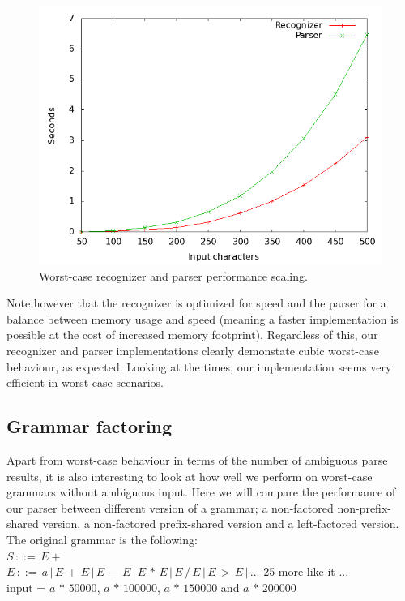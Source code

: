 \documentclass[a4paper,10pt]{article}
\begin{document}
\begin{figure}[H]
\centering
\includegraphics[scale=0.35]{worst-case.png}
\caption{Worst-case recognizer and parser performance scaling.}
\end{figure}

Note however that the recognizer is optimized for speed and the parser for a balance between memory usage and speed (meaning a faster implementation is possible at the cost of increased memory footprint). Regardless of this, our recognizer and parser implementations clearly demonstate cubic worst-case behaviour, as expected. Looking at the times, our implementation seems very efficient in worst-case scenarios.

\subsection{Grammar factoring}

Apart from worst-case behaviour in terms of the number of ambiguous parse results, it is also interesting to look at how well we perform on worst-case grammars without ambiguous input. Here we will compare the performance of our parser between different version of a grammar; a non-factored non-prefix-shared version, a non-factored prefix-shared version and a left-factored version. The original grammar is the following:\\
$S\,::=\,E+$\\
$E\,::=\,a\,|\,E\,+\,E\,|\,E\,-\,E\,|\,E\,*\,E\,|\,E\,/\,E\,|\,E\,>\,E\,|\,...$ 25 more like it ...\\
input = $a\,*\,50000$, $a\,*\,100000$, $a\,*\,150000$ and $a\,*\,200000$
\end{document}
